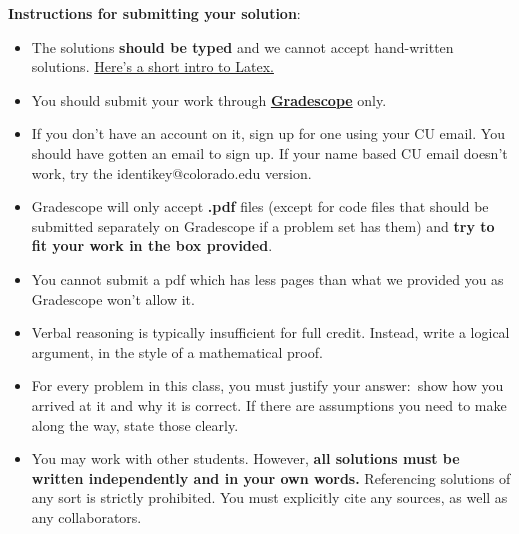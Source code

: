 \documentclass[12pt]{article}
\theoremstyle{remark}
\begin{document}

\renewcommand{\headrulewidth}{0.5pt}

\phantom{Test}

\begin{small}
\textbf{Instructions for submitting your solution}:
\vspace{-5mm} 

\begin{itemize}
	\item The solutions \textbf{should be typed} and we cannot accept hand-written solutions. \href{http://ece.uprm.edu/~caceros/latex/introduction.pdf}{Here's a short intro to Latex.}
	\item You should submit your work through \href{https://www.gradescope.com/courses/59294}{\textbf{Gradescope}} only.
	\item If you don't have an account on it, sign up for one using your CU email. You should have gotten an email to sign up. If your name based CU email doesn't work, try the identikey@colorado.edu version. 
	\item Gradescope will only accept \textbf{.pdf} files (except for code files that should be submitted separately on Gradescope if a problem set has them) and \textbf{try to fit your work in the box provided}. 
	\item You cannot submit a pdf which has less pages than what we provided you as Gradescope won't allow it. 
	\item Verbal reasoning is typically insufficient for full credit. Instead, write a logical argument, in the style of a mathematical proof.
	\item For every problem in this class, you must justify your answer:\ show how you arrived at it and why it is correct. If there are assumptions you need to make along the way, state those clearly.
	
	\item You may work with other students. However, \textbf{all solutions must be written independently and in your own words.} Referencing solutions of any sort is strictly prohibited. You must explicitly cite any sources, as well as any collaborators. 
\end{itemize}



\vspace{-4mm} 
\end{small}
\end{document}
